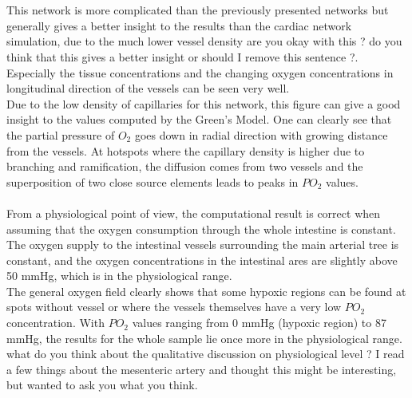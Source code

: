 %
\\
\\This network is more complicated than the previously presented networks but generally gives a better insight to the results than the cardiac network simulation, due to the much lower vessel density {\color{red} are you okay with this ? do you think that this gives a better insight or should I remove this sentence ?}. Especially the tissue concentrations and the changing oxygen concentrations in longitudinal direction of the vessels can be seen very well.
\\Due to the low density of capillaries for this network, this figure can give a good insight to the values computed by the Green's Model. One can clearly see that the partial pressure of $O_2$ goes down in radial direction with growing distance from the vessels. At hotspots where the capillary density is higher due to branching and ramification, the diffusion comes from two vessels and the superposition of two close source elements leads to peaks in $PO_2$ values.\\
\\From a physiological point of view, the computational result is correct when assuming that the oxygen consumption through the whole intestine is constant. The oxygen supply to the intestinal vessels surrounding the main arterial tree is constant, and the oxygen concentrations in the intestinal ares are slightly above 50 mmHg, which is in the physiological range.
\\The general oxygen field clearly shows that some hypoxic regions can be found at spots without vessel or where the vessels themselves have a very low $PO_2$ concentration. With $PO_2$ values ranging from $0$ mmHg (hypoxic region) to 87 mmHg, the results for the whole sample lie once more in the physiological range.
\\{\color{red} what do you think about the qualitative discussion on physiological level ? I read a few things about the mesenteric artery and thought this might be interesting, but wanted to ask you what you think.}

